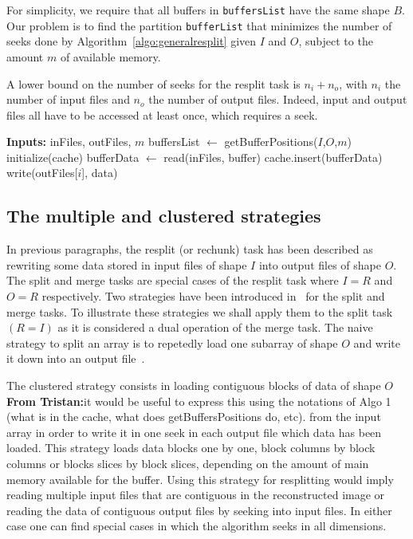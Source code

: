 \documentclass[conference]{IEEEtran}
\newcommand{\tristan}[1]{\color{orange}\textbf{From Tristan:}#1\color{black}}
\begin{document}
For simplicity, we require that all buffers in \texttt{buffersList} have
the same shape $B$. Our problem is to find the partition \texttt{bufferList}
that minimizes the number of seeks done by Algorithm~\ref{algo:generalresplit}
given $I$ and $O$, subject to the amount $m$ of available memory.

A lower bound on the number of seeks for the resplit task is $n_i + n_o$,
with $n_i$ the number of input files and $n_o$ the number of output files.
Indeed, input and output files all have to be accessed at least once, which
requires a seek.

\begin{algorithm}
  \caption{General resplit algorithm \tristan{The condition in the second for loop should be made more accurate}}
  \label{algo:generalresplit}
  \begin{algorithmic}
    \STATE \textbf{Inputs:} inFiles, outFiles, $m$
    \STATE buffersList $\leftarrow$ getBufferPositions($I$,$O$,$m$)
    \STATE initialize(cache)
      \STATE bufferData $\leftarrow$ read(inFiles, buffer)
      \STATE cache.insert(bufferData)
        \STATE write(outFiles[$i$], data)
      \ENDFOR
    \ENDFOR

  \end{algorithmic}
\end{algorithm}

\subsection{The multiple and clustered strategies}
In previous paragraphs, the resplit (or rechunk) task has been described as
rewriting some data stored in input files of shape $I$ into output files of
shape $O$. The split and merge tasks are special cases of the resplit task
where $I=R$ and $O=R$ respectively.
Two strategies have been introduced in~\cite{seqalgorithms} for the split and
merge tasks. To illustrate these strategies we shall apply them to the split task
$(R = I)$ as it is considered a dual operation of the merge task. The naive
strategy to split an array is to repetedly load one subarray of shape $O$ and
write it down into an output file~\cite{seqalgorithms}.

The clustered strategy consists in loading contiguous blocks of data of shape $O$ \tristan{it would be useful to express this using the notations of Algo 1 (what is in the cache, what does getBuffersPositions do, etc).}
from the input array in order to write it in one seek in each output file which
data has been loaded. This strategy loads data blocks one by one, block columns
by block columns or blocks slices by block slices, depending on the amount of
main memory available for the buffer. Using this strategy for resplitting would
imply reading multiple input files that are contiguous in the reconstructed
image or reading the data of contiguous output files by seeking into input files.
In either case one can find special cases in which the algorithm seeks in all
dimensions.
\end{document}
